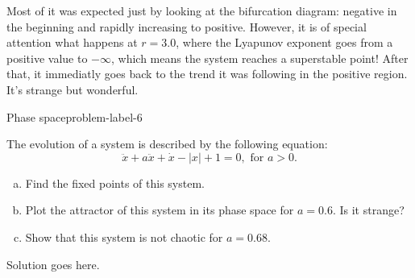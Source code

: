 \begin{enumerate}[(a)]
    Most of it was expected just by looking at the bifurcation diagram: 
    negative in the beginning and rapidly increasing to positive. However, 
    it is of special attention what happens at $r = 3.0$, where the Lyapunov
    exponent goes from a positive value to $-\infty$, which means the system reaches a superstable point!
    After that, it immediatly goes back to the trend it was following in the positive
    region. It's strange but wonderful.


\end{enumerate}

\begin{problem}{Phase space}{problem-label-6}

    The evolution of a system is described by the following equation:
    \[
        \ddot{x} + a\ddot{x}+\dot{x}-|x|+1=0, \text{ for } a > 0.
    \]

    \begin{enumerate}[(a)]
        \item Find the fixed points of this system.
        \item Plot the attractor of this system in its phase space for $a = 0.6$.
        Is it strange?
        \item Show that this system is not chaotic for $a = 0.68$.
    \end{enumerate}

\end{problem}

Solution goes here.





